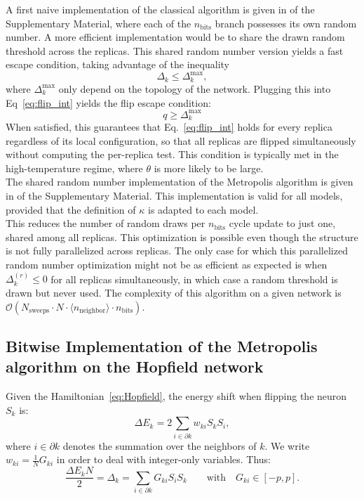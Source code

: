 A first naive implementation of the classical algorithm is given in  of the Supplementary Material, where each of the $n_\text{bits}$ branch possesses its own random number.
A more efficient implementation would be to share the drawn random threshold across the replicas. This shared random number version yields a fast escape condition, taking advantage of the inequality
\begin{equation*}
    \Delta_k \leq \Delta_k^\text{max} ,
\end{equation*}
where $\Delta_k^\text{max} $ only depend on the topology of the network.
Plugging this into Eq~\eqref{eq:flip_int} yields the flip escape condition:
\begin{equation}
q \geq \Delta_k^\text{max}
 \label{eq:flip_escape_condition}
\end{equation}
When satisfied, this guarantees that Eq.~\eqref{eq:flip_int} holds for every replica regardless of its local configuration, so that all replicas are flipped simultaneously without computing the per-replica test.
This condition is typically met in the high-temperature regime, where $\theta$ is more likely to be large.\\
The shared random number implementation of the Metropolis algorithm is given in  of the Supplementary Material. This implementation is valid for all models, provided that the definition of $\kappa$ is adapted to each model.\\
This reduces the number of random draws per $n_\text{bits}$ cycle update to just one, shared among all replicas. This optimization is possible even though the structure is not fully parallelized across replicas. The only case for which this parallelized random number optimization might not be as efficient as expected is when $\Delta_k^{(r)} \leq 0$  for all replicas simultaneously, in which case a random threshold is drawn but never used.
The complexity of this algorithm on a given network is $\mathcal{O}\left(N_\text{sweeps}\cdot N \cdot \langle n_\text{neighbor} \rangle \cdot n_\text{bits} \right)$.
\subsection{Bitwise Implementation of the Metropolis algorithm on the Hopfield network}
Given the Hamiltonian~\eqref{eq:Hopfield}, the energy shift when flipping the neuron $S_k$ is:
\begin{equation}
  \Delta E_k= 2\sum_{i \in \partial k}w_{ki}S_kS_i,
\end{equation}
where $i \in \partial k$ denotes the summation over the neighbors of $k$. We write $w_{ki} = \frac{1}{N}G_{ki}$ in order to deal with integer-only variables. Thus:
\begin{equation*}
    \frac{\Delta E_k N}{2} = \Delta_k= \sum_{i \in \partial k} G_{ki} S_i S_k \qquad \text{with} \quad G_{ki} \in [-p, p].
\end{equation*}

